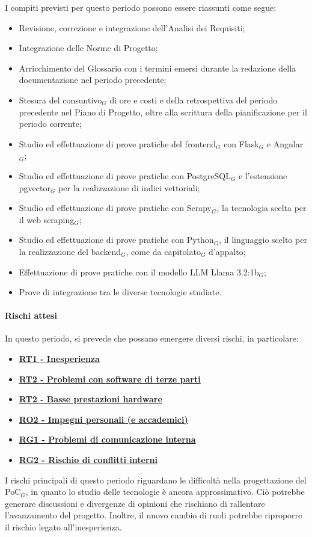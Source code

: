 I compiti previsti per questo periodo possono essere riassunti come segue:  
\begin{itemize}
    \item Revisione, correzione e integrazione dell'Analisi dei Requisiti;
    \item Integrazione delle Norme di Progetto;
    \item Arricchimento del Glossario con i termini emersi durante la redazione della documentazione nel periodo precedente;
    \item Stesura del consuntivo$_G$ di ore e costi e della retrospettiva del periodo precedente nel Piano di Progetto, oltre alla scrittura della pianificazione per il periodo corrente;
    \item Studio ed effettuazione di prove pratiche del frontend$_G$ con Flask$_G$ e Angular$_G$;
    \item Studio ed effettuazione di prove pratiche con PostgreSQL$_G$ e l'estensione pgvector$_G$ per la realizzazione di indici vettoriali;
    \item Studio ed effettuazione di prove pratiche con Scrapy$_G$, la tecnologia scelta per il web scraping$_G$;
    \item Studio ed effettuazione di prove pratiche con Python$_G$, il linguaggio scelto per la realizzazione del backend$_G$, come da capitolato$_G$ d'appalto;
    \item Effettuazione di prove pratiche con il modello LLM Llama 3.2:1b$_G$;
    \item Prove di integrazione tra le diverse tecnologie studiate.
\end{itemize}

\paragraph{Rischi attesi}  
In questo periodo, si prevede che possano emergere diversi rischi, in particolare:

\begin{itemize}
    \item \textbf{\hyperlink{RT1}{RT1 - Inesperienza}}
    \item \textbf{\hyperlink{RT2}{RT2 - Problemi con software di terze parti}}
    \item \textbf{\hyperlink{RT2}{RT2 - Basse prestazioni hardware}}
    \item \textbf{\hyperlink{RO2}{RO2 - Impegni personali (e accademici)}}
    \item \textbf{\hyperlink{RG1}{RG1 - Problemi di comunicazione interna}}
    \item \textbf{\hyperlink{RG2}{RG2 - Rischio di conflitti interni}}
\end{itemize}
I rischi principali di questo periodo riguardano le difficoltà nella progettazione del PoC$_G$, in quanto lo studio delle tecnologie è ancora approssimativo. Ciò potrebbe generare discussioni e divergenze di opinioni che rischiano di rallentare l'avanzamento del progetto.
Inoltre, il nuovo cambio di ruoli potrebbe riproporre il rischio legato all'inesperienza.

